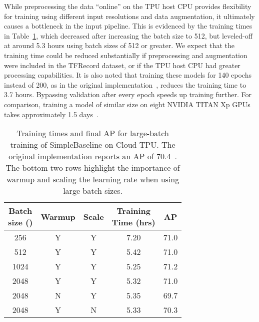 \documentclass{ieeeaccess}
\begin{document}
While preprocessing the data ``online'' on the TPU host CPU provides flexibility for training using different input resolutions and data augmentation, it ultimately causes a bottleneck in the input pipeline. This is evidenced by the training times in Table~\ref{tab:sb_tpu}, which decreased after increasing the batch size to 512, but leveled-off at around 5.3 hours using batch sizes of 512 or greater. We expect that the training time could be reduced substantially if preprocessing and augmentation were included in the TFRecord dataset, or if the TPU host CPU had greater processing capabilities. It is also noted that training these models for 140 epochs instead of 200, as in the original implementation~\cite{xiao2018simple}, reduces the training time to 3.7 hours. Bypassing validation after every epoch speeds up training further. For comparison, training a model of similar size on eight NVIDIA TITAN Xp GPUs takes approximately 1.5 days~\cite{chen2018cascaded}. 

\begin{table}
\footnotesize
\centering
\begin{tabular}{c|c|c|c|c}
	\hline
	\makecell{Batch\\size ()} & Warmup & Scale  & \makecell{Training\\Time (hrs)} & AP\\
	\hline
	256 & Y & Y & 7.20 & 71.0\\
	512 & Y & Y & 5.42 & 71.0\\
	1024 & Y & Y & 5.25 & 71.2\\
	2048 & Y & Y & 5.32 & 71.0\\
	\hline
	2048 & N & Y & 5.35 & 69.7\\
	2048 & Y & N & 5.33 & 70.3\\
	\hline
\end{tabular}
\caption{Training times and final AP for large-batch training of SimpleBaseline on Cloud TPU. The original implementation reports an AP of 70.4~\cite{xiao2018simple}. The bottom two rows highlight the importance of warmup and scaling the learning rate when using large batch sizes.}
\label{tab:sb_tpu}
\end{table}
\end{document}
